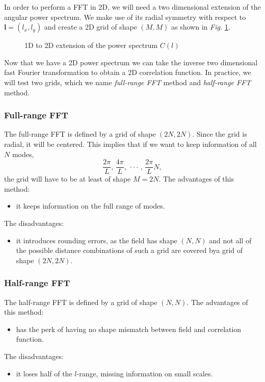 In order to perform a FFT in 2D, we will need a two dimensional extension of the angular power spectrum. We make use of its radial symmetry with respect to $\bm{l}=(l_x,l_y)$ and create a 2D grid of shape $(M,M)$ as shown in \textit{Fig. }\ref{tik:1D to 2D}. 
\begin{figure}[h]
\centering
{}
\caption{1D to 2D extension of the power spectrum $C(l)$}
\label{tik:1D to 2D}
\end{figure}
Now that we have a 2D power spectrum we can take the inverse two dimensional fast Fourier transformation to obtain a 2D correlation function. In practice, we will test two grids, which we name \textit{full-range FFT} method and \textit{half-range FFT} method. 
\subsubsection{Full-range FFT}
The full-range FFT is defined by a grid of shape $(2N,2N)$. Since the grid is radial, it will be centered. This implies that if we want to keep information of all $N$ modes,
\begin{equation}
    \frac{2\pi}{L},\, \frac{4\pi}{L},\,\cdot\cdot\cdot\,,\, \frac{2\pi}{L}N,
\end{equation}
the grid will have to be at least of shape $M=2N$.
The advantages of this method:
\begin{itemize}
    \item it keeps information on the full range of modes.
\end{itemize}
The disadvantages:
\begin{itemize}
    \item it introduces rounding errors, as the field has shape $(N,N)$ and not all of the possible distance combinations of such a grid are covered bya grid of shape $(2N,2N)$.
\end{itemize}
\subsubsection{Half-range FFT}
The half-range FFT is defined by a grid of shape $(N,N)$.
The advantages of this method:
\begin{itemize}
    \item has the perk of having no shape mismatch between field and correlation function.
\end{itemize}
The disadvantages:
\begin{itemize}
    \item it loses half of the $l$-range, missing information on small scales.
\end{itemize}